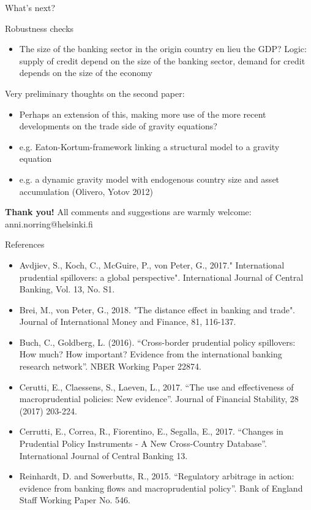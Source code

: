 \documentclass{beamer}
\begin{document}
\begin{frame}{What's next?}
\begin{block}{Robustness checks}
\begin{itemize}
\item The size of the banking sector in the origin country en lieu the GDP? Logic: supply of credit depend on the size of the banking sector, demand for credit depends on the size of the economy
\end{itemize}
\end{block}
\begin{block}{Very preliminary thoughts on the second paper:}
\begin{itemize}
\item Perhaps an extension of this, making more use of the more recent developments on the trade side of gravity equations?
\item e.g. Eaton-Kortum-framework linking a structural model to a gravity equation 
\item e.g. a dynamic gravity model with endogenous country size and asset accumulation (Olivero, Yotov 2012)
\end{itemize}
\end{block}
\end{frame}

\begin{frame}
\begin{center}
\textbf{Thank you!}
\vskip 1cm
All comments and suggestions are warmly welcome: \\
anni.norring@helsinki.fi
\end{center}
\end{frame}

\begin{frame}{References}
\begin{itemize}
\tiny
\item Avdjiev, S., Koch, C., McGuire, P., von Peter, G., 2017." International prudential spillovers: a global perspective". International Journal of Central Banking, Vol. 13, No. S1.
\item Brei, M., von Peter, G., 2018. "The distance effect in banking and trade". Journal of International Money and Finance, 81, 116-137.
\item Buch, C., Goldberg, L. (2016). “Cross-border prudential policy spillovers: How much? How important? Evidence from the international banking research network”. NBER Working Paper 22874.
\item Cerutti, E., Claessens, S., Laeven, L., 2017. “The use and effectiveness of macroprudential policies: New evidence”. Journal of Financial Stability, 28 (2017) 203-224.
\item Cerrutti, E., Correa, R., Fiorentino, E., Segalla, E., 2017. “Changes in Prudential Policy Instruments - A New Cross-Country Database”. International Journal of Central Banking 13.
\item Reinhardt, D. and Sowerbutts, R., 2015. “Regulatory arbitrage in action: evidence from banking flows and macroprudential policy”. Bank of England Staff Working Paper No. 546.
\end{itemize}
\end{frame}
\end{document}
